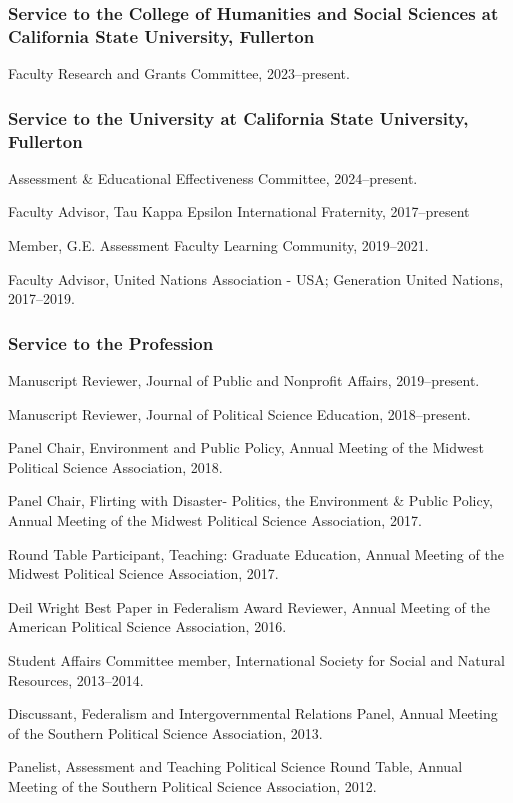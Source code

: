 \documentclass[12pt,letterpaper]{article}
\renewenvironment{itemize}{
  \begin{list}{}{
    \setlength{\leftmargin}{1.5em}
    \setlength{\itemsep}{0.25em}
    \setlength{\parskip}{0pt}
    \setlength{\parsep}{0.25em}
  }
}{
  \end{list}
}
\begin{document}
\subsubsection*{Service to the College of Humanities and Social Sciences at California State University, Fullerton}
\begin{itemize}\leftmargin=2pt\itemindent=-15pt
    \item Faculty Research and Grants Committee, 2023--present.
\end{itemize}

\subsubsection*{Service to the University at California State University, Fullerton}
\begin{itemize}\leftmargin=2pt\itemindent=-15pt
    \item Assessment \& Educational Effectiveness Committee, 2024--present.
    \item Faculty Advisor, Tau Kappa Epsilon International Fraternity, 2017--present
    \item Member, G.E. Assessment Faculty Learning Community, 2019--2021.
    \item Faculty Advisor, United Nations Association - USA; Generation United Nations, 2017--2019.
\end{itemize}

\subsubsection*{Service to the Profession}
\begin{itemize}\leftmargin=2pt\itemindent=-15pt
	\item Manuscript Reviewer, Journal of Public and Nonprofit Affairs, 2019--present.
	\item Manuscript Reviewer, Journal of Political Science Education, 2018--present.
	\item Panel Chair, Environment and Public Policy, Annual Meeting of the Midwest Political Science Association, 2018.
	\item Panel Chair, Flirting with Disaster- Politics, the Environment \& Public Policy, Annual Meeting of the Midwest Political Science Association, 2017. 
	\item Round Table Participant, Teaching: Graduate Education, Annual Meeting of the Midwest Political Science Association, 2017.
	\item Deil Wright Best Paper in Federalism Award Reviewer, Annual Meeting of the American Political Science Association, 2016.
	\item Student Affairs Committee member, International Society for Social and Natural Resources, 2013--2014.
	\item Discussant, Federalism and Intergovernmental Relations Panel, Annual Meeting of the Southern Political Science Association, 2013.
	\item Panelist, Assessment and Teaching Political Science Round Table, Annual Meeting of the Southern Political Science Association, 2012.
\end{itemize}
\end{document}
